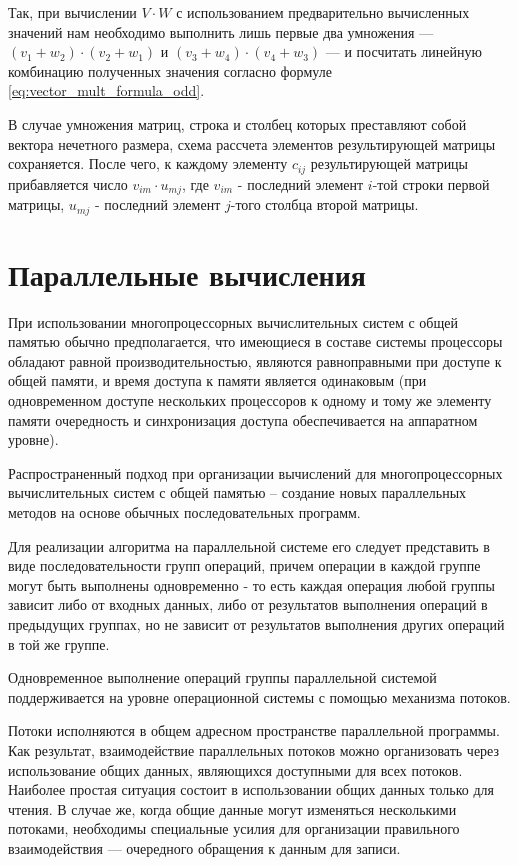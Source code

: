 \documentclass[12pt]{report}
\begin{document}
Так, при вычислении $V \cdot W$ с использованием предварительно вычисленных значений нам необходимо выполнить лишь первые два умножения --- $(v_1 + w_2) \cdot (v_2 + w_1)$ и $(v_3 + w_4) \cdot (v_4 + w_3)$ --- и посчитать линейную комбинацию полученных значения согласно формуле \ref{eq:vector_mult_formula_odd}.

В случае умножения матриц, строка и столбец которых преставляют собой вектора нечетного размера, схема рассчета элементов результирующей матрицы сохраняется. После чего, к каждому элементу $c_{ij}$ результирующей матрицы прибавляется число $v_{im} \cdot u_{mj}$, где $v_{im}$ - последний элемент $i$-той строки первой матрицы, $u_{mj}$ - последний элемент $j$-того столбца второй матрицы.

\section{Параллельные вычисления}

При использовании многопроцессорных вычислительных систем с общей памятью обычно предполагается, что имеющиеся в составе системы процессоры обладают равной производительностью, являются равноправными при доступе к общей памяти, и время доступа к памяти является одинаковым (при одновременном доступе нескольких процессоров к одному и тому же элементу памяти очередность и синхронизация доступа обеспечивается на аппаратном уровне).

Распространенный подход при организации вычислений для многопроцессорных вычислительных систем с общей памятью – создание новых параллельных методов на основе обычных последовательных программ. 

Для реализации алгоритма на параллельной системе его следует представить в виде последовательности групп операций, причем операции в каждой группе могут быть выполнены одновременно - то есть каждая операция любой группы зависит либо от входных данных, либо от результатов выполнения операций в предыдущих группах, но не зависит от результатов выполнения других операций в той же группе.

Одновременное выполнение операций группы параллельной системой поддерживается на уровне операционной системы с помощью механизма потоков.  

Потоки исполняются в общем адресном пространстве параллельной программы. Как результат, взаимодействие параллельных потоков можно организовать через использование общих данных, являющихся доступными для всех потоков. Наиболее простая ситуация состоит в использовании общих данных только для чтения. В случае же, когда общие данные могут изменяться несколькими потоками, необходимы специальные усилия для организации правильного взаимодействия --- очередного обращения к данным для записи.
\end{document}
